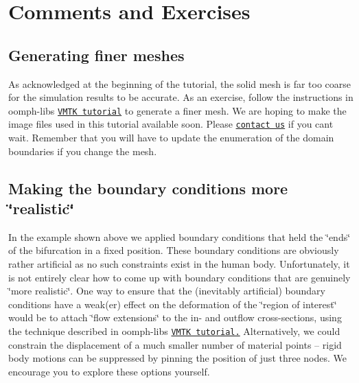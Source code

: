  

\hypertarget{index_comm_ex}{}\section{Comments and Exercises}\label{index_comm_ex}
\hypertarget{index_finer}{}\subsection{Generating finer meshes}\label{index_finer}
As acknowledged at the beginning of the tutorial, the solid mesh is far too coarse for the simulation results to be accurate. As an exercise, follow the instructions in {\ttfamily oomph-\/lib\textquotesingle{}s} \href{../../../meshes/mesh_from_vmtk/html/index.html}{\tt V\+M\+TK tutorial} to generate a finer mesh. We are hoping to make the image files used in this tutorial available soon. Please \href{../../../contact/html/index.html}{\tt contact us} if you can\textquotesingle{}t wait. Remember that you will have to update the enumeration of the domain boundaries if you change the mesh.



\hypertarget{index_bc}{}\subsection{Making the boundary conditions more \char`\"{}realistic\char`\"{}}\label{index_bc}
In the example shown above we applied boundary conditions that held the \char`\"{}ends\char`\"{} of the bifurcation in a fixed position. These boundary conditions are obviously rather artificial as no such constraints exist in the human body. Unfortunately, it is not entirely clear how to come up with boundary conditions that are genuinely \char`\"{}more 
realistic\char`\"{}. One way to ensure that the (inevitably artificial) boundary conditions have a weak(er) effect on the deformation of the \char`\"{}region of interest\char`\"{} would be to attach \char`\"{}flow extensions\char`\"{} to the in-\/ and outflow cross-\/sections, using the technique described in {\ttfamily oomph-\/lib\textquotesingle{}s} \href{../../../meshes/mesh_from_vmtk/html/index.html#add_extensions}{\tt V\+M\+TK tutorial.} Alternatively, we could constrain the displacement of a much smaller number of material points -- rigid body motions can be suppressed by pinning the position of just three nodes. We encourage you to explore these options yourself.



